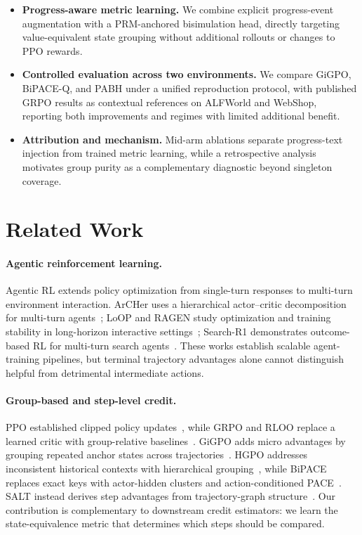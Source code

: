\documentclass[10pt,twocolumn,letterpaper]{article}
\newcommand{\method}{PABH\xspace}
\begin{document}
\begin{itemize}
\item \textbf{Progress-aware metric learning.} We combine explicit progress-event augmentation with a PRM-anchored bisimulation head, directly targeting value-equivalent state grouping without additional rollouts or changes to PPO rewards.
\item \textbf{Controlled evaluation across two environments.} We compare GiGPO, BiPACE-Q, and \method under a unified reproduction protocol, with published GRPO results as contextual references on ALFWorld and WebShop, reporting both improvements and regimes with limited additional benefit.
\item \textbf{Attribution and mechanism.} Mid-arm ablations separate progress-text injection from trained metric learning, while a retrospective analysis motivates group purity as a complementary diagnostic beyond singleton coverage.
\end{itemize}

\section{Related Work}
\label{sec:related}

\paragraph{Agentic reinforcement learning.}
Agentic RL extends policy optimization from single-turn responses to multi-turn environment interaction. ArCHer uses a hierarchical actor--critic decomposition for multi-turn agents~\cite{archer}; LoOP and RAGEN study optimization and training stability in long-horizon interactive settings~\cite{loop,ragen}; Search-R1 demonstrates outcome-based RL for multi-turn search agents~\cite{searchr1}. These works establish scalable agent-training pipelines, but terminal trajectory advantages alone cannot distinguish helpful from detrimental intermediate actions.

\paragraph{Group-based and step-level credit.}
PPO established clipped policy updates~\cite{ppo}, while GRPO and RLOO replace a learned critic with group-relative baselines~\cite{grpo,rloo}. GiGPO adds micro advantages by grouping repeated anchor states across trajectories~\cite{gigpo}. HGPO addresses inconsistent historical contexts with hierarchical grouping~\cite{hgpo}, while BiPACE replaces exact keys with actor-hidden clusters and action-conditioned PACE~\cite{bipace}. SALT instead derives step advantages from trajectory-graph structure~\cite{salt}. Our contribution is complementary to downstream credit estimators: we learn the state-equivalence metric that determines which steps should be compared.
\end{document}
